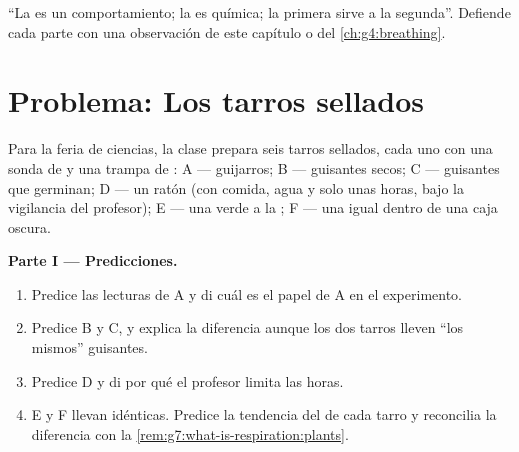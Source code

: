 \begin{exercise}[$\star\star\star$]\label{exo:g7:what-is-respiration:12}
``La  es un comportamiento; la  es química; la
primera sirve a la segunda''. Defiende cada parte con una observación
de este capítulo o del \cref{ch:g4:breathing}.
\end{exercise}

\section{Problema: Los tarros sellados}

\begin{problem}\label{pb:g7:what-is-respiration:1}
Para la feria de ciencias, la clase prepara seis tarros sellados, cada
uno con una sonda de  y una trampa de : A ---
guijarros; B --- guisantes secos; C --- guisantes que germinan; D ---
un ratón (con comida, agua y solo unas horas, bajo la vigilancia del
profesor); E --- una  verde a la ; F --- una  igual
dentro de una caja oscura.

\medskip\noindent\textbf{Parte I --- Predicciones.}
\begin{enumerate}
  \item Predice las lecturas de A y di cuál es el papel de A en el
        experimento.
  \item Predice B y C, y explica la diferencia aunque los dos tarros
        lleven ``los mismos'' guisantes.
  \item Predice D y di por qué el profesor limita las horas.
  \item E y F llevan  idénticas. Predice la tendencia del
         de cada tarro y reconcilia la diferencia con la
        \cref{rem:g7:what-is-respiration:plants}.
\end{enumerate}


\end{problem}
